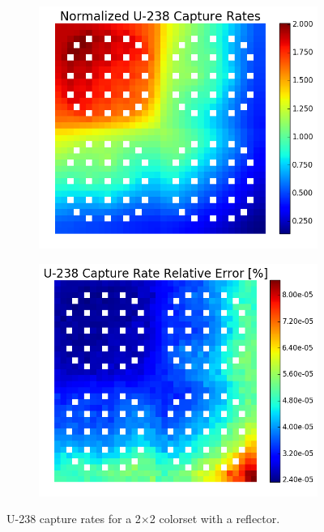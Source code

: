 \begin{figure}[h!]
\centering
\begin{subfigure}{0.44\textwidth}
  \centering
  \includegraphics[width=\linewidth]{figures/benchmarks/capture-rates/capt-mean-reflector}
  \caption{}
  \label{fig:chap7-capt-rate-mean-reflector}
\end{subfigure}%
\begin{subfigure}{0.44\textwidth}
  \centering
  \includegraphics[width=\linewidth]{figures/benchmarks/capture-rates/capt-rel-err-reflector}
  \caption{}
  \label{fig:chap7-capt-rate-rel-err-reflector}
\end{subfigure}%
\caption[U-238 capture rates for a 2$\times$2 colorset with a reflector]{U-238 capture rates for a 2$\times$2 colorset with a reflector.}
\label{fig:chap7-capt-rates-2x2}
\end{figure}

